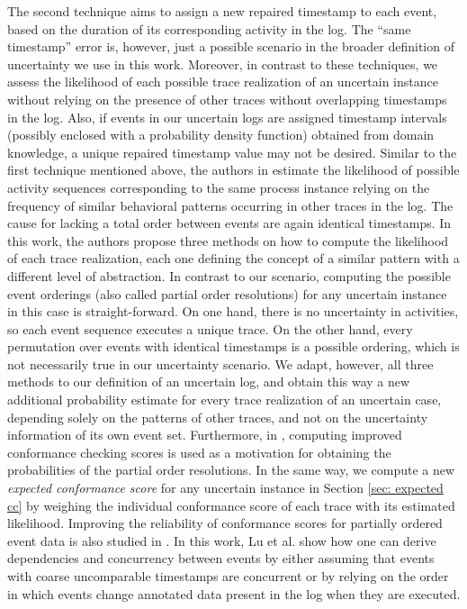 The second technique aims to assign a new repaired timestamp to each event, based on the duration of its corresponding activity in the log.
The ``same timestamp'' error is, however, just a possible scenario in the broader definition of uncertainty we use in this work.
Moreover, in contrast to these techniques, we assess the likelihood of each possible trace realization of an uncertain instance without relying on the presence of other traces without overlapping timestamps in the log.
Also, if events in our uncertain logs are assigned timestamp intervals (possibly enclosed with a probability density function) obtained from domain knowledge, a unique repaired timestamp value may not be desired.
Similar to the first technique mentioned above, the authors in \cite{por} estimate the likelihood of possible activity sequences corresponding to the same process instance relying on the frequency of similar behavioral patterns occurring in other traces in the log.
The cause for lacking a total order between events are again identical timestamps.
In this work, the authors propose three methods on how to compute the likelihood of each trace realization, each one defining the concept of a similar pattern with a different level of abstraction.
In contrast to our scenario, computing the possible event orderings (also called partial order resolutions) for any uncertain instance in this case is straight-forward.
On one hand, there is no uncertainty in activities, so each event sequence executes a unique trace.
On the other hand, every permutation over events with identical timestamps is a possible ordering, which is not necessarily true in our uncertainty scenario.
We adapt, however, all three methods to our definition of an uncertain log, and obtain this way a new additional probability estimate for every trace realization of an uncertain case, depending solely on the patterns of other traces, and not on the uncertainty information of its own event set.
Furthermore, in \cite{por}, computing improved conformance checking scores is used as a motivation for obtaining the probabilities of the partial order resolutions.
In the same way, we compute a new \textit{expected conformance score} for any uncertain instance in Section \ref{sec: expected cc} by weighing the individual conformance score of each trace with its estimated likelihood.
Improving the reliability of conformance scores for partially ordered event data is also studied in \cite{xixi}.
In this work, Lu et al. show how one can derive dependencies and concurrency between events by either assuming that events with coarse uncomparable timestamps are concurrent or by relying on the order in which events change annotated data present in the log when they are executed.
